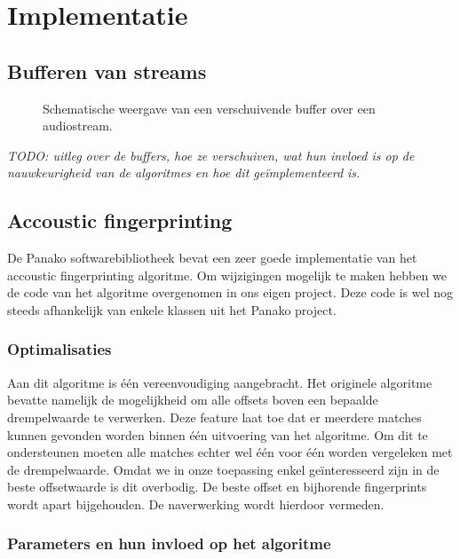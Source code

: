 \section{Implementatie}

\subsection{Bufferen van streams}

\begin{figure}[h!]
	\captionsetup{width=0.7\textwidth}
	\caption[Schematische weergave van de buffer]{Schematische weergave van een verschuivende buffer over een audiostream.}
	\begin{center}
		\advance\parskip0.3cm
		
	\end{center}
\end{figure}

\textit{TODO: uitleg over de buffers, hoe ze verschuiven, wat hun invloed is op de nauwkeurigheid van de algoritmes en hoe dit geïmplementeerd is.}

\subsection{Accoustic fingerprinting}

De Panako softwarebibliotheek bevat een zeer goede implementatie van het accoustic fingerprinting algoritme. Om wijzigingen mogelijk te maken hebben we de code van het algoritme overgenomen in ons eigen project. Deze code is wel nog steeds afhankelijk van enkele klassen uit het Panako project. 

\subsubsection{Optimalisaties}

Aan dit algoritme is één vereenvoudiging aangebracht. Het originele algoritme bevatte namelijk de mogelijkheid om alle offsets boven een bepaalde drempelwaarde te verwerken. Deze feature laat toe dat er meerdere matches kunnen gevonden worden binnen één uitvoering van het algoritme. Om dit te ondersteunen moeten alle matches echter wel één voor één worden vergeleken met de drempelwaarde. Omdat we in onze toepassing enkel geïnteresseerd zijn in de beste offsetwaarde is dit overbodig. De beste offset en bijhorende fingerprints wordt apart bijgehouden. De naverwerking wordt hierdoor vermeden.

\subsubsection{Parameters en hun invloed op het algoritme}

